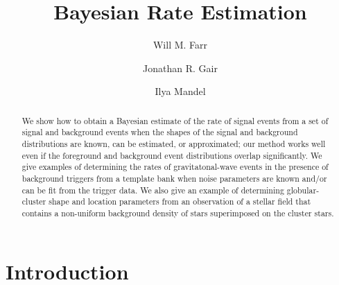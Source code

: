 \documentclass[aps,prd]{revtex4-1}
\begin{document}
\title{Bayesian Rate Estimation}

\author{Will M. Farr}

\author{Jonathan R. Gair}

\author{Ilya Mandel}


\begin{abstract}
  We show how to obtain a Bayesian estimate of the rate of signal
  events from a set of signal and background events when the shapes of
  the signal and background distributions are known, can be estimated,
  or approximated; our method works well even if the foreground and
  background event distributions overlap significantly.  We give
  examples of determining the rates of gravitatonal-wave events in
  the presence of background triggers from a template bank when noise
  parameters are known and/or can be fit from the trigger data.  We
  also give an example of determining globular-cluster shape and
  location parameters from an observation of a stellar field that
  contains a non-uniform background density of stars superimposed on
  the cluster stars.
\end{abstract}

\maketitle

\section{Introduction}
\end{document}
